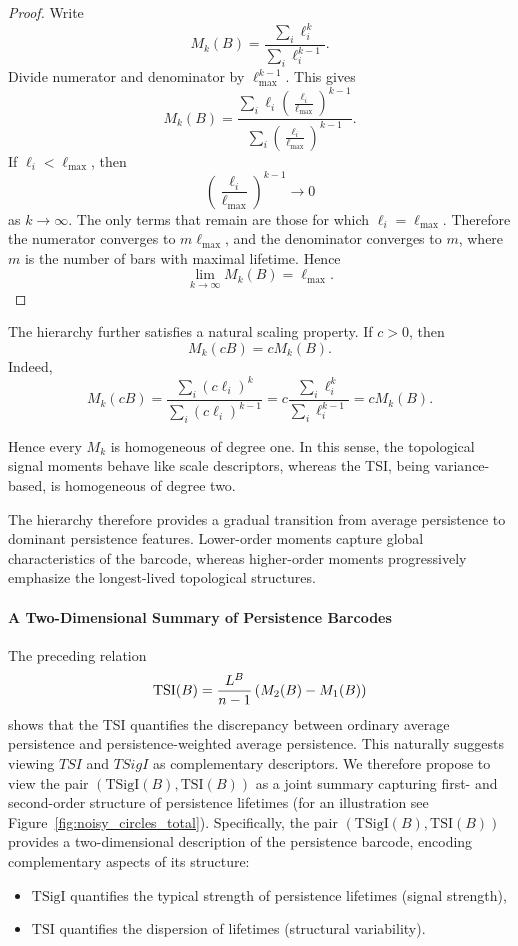 \documentclass[11pt]{amsart}
\theoremstyle{definition}
\newcommand{\tsi}[0]{\textup{TSI}}
\begin{document}
\begin{proof}
Write
\[
M_k(B)=
\frac{\sum_i\ell_i^k}{\sum_i\ell_i^{k-1}}.
\]
Divide numerator and denominator by \(\ell_{\max}^{k-1}\). This gives
\[
M_k(B)
=
\frac{
\sum_i
\ell_i
\left(
\frac{\ell_i}{\ell_{\max}}
\right)^{k-1}
}
{
\sum_i
\left(
\frac{\ell_i}{\ell_{\max}}
\right)^{k-1}
}.
\]
If \(\ell_i<\ell_{\max}\), then
\[
\left(
\frac{\ell_i}{\ell_{\max}}
\right)^{k-1}
\to 0
\]
as \(k\to\infty\). The only terms that remain are those for which
\(\ell_i=\ell_{\max}\). Therefore the numerator converges to \(m\ell_{\max}\), and the denominator converges to \(m\), where \(m\) is the number of bars with maximal lifetime. Hence
\[
\lim_{k\to\infty}M_k(B)=\ell_{\max}.
\]
\end{proof}


The hierarchy further satisfies a natural scaling property. If \(c>0\), then
\[
M_k(cB)
=
cM_k(B).
\]
Indeed,
\[
M_k(cB)
=
\frac{\sum_i(c\ell_i)^k}{\sum_i(c\ell_i)^{k-1}}
=
c
\frac{\sum_i\ell_i^k}{\sum_i\ell_i^{k-1}}
=
cM_k(B).
\]

Hence every \(M_k\) is homogeneous of degree one. In this sense, the topological signal moments behave like scale descriptors, whereas the TSI, being variance-based, is homogeneous of degree two.


The hierarchy therefore provides a gradual transition from average persistence to dominant persistence features. Lower-order moments capture global characteristics of the barcode, whereas higher-order moments progressively emphasize the longest-lived topological structures.

\medskip

\paragraph{{\bf A Two-Dimensional Summary of Persistence Barcodes}}

The preceding relation
\[
\tsi(B)=\frac{L^B}{n-1} \left(M_2(B)-M_1(B)\right)
\]
shows that the TSI quantifies the discrepancy between ordinary average persistence and persistence-weighted average persistence. This naturally
suggests viewing \(TSI\) and \(TSigI\) as complementary descriptors. We therefore propose to view the pair
\((\mathrm{TSigI}(B),\mathrm{TSI}(B))\) as a joint summary capturing first- and second-order structure of persistence lifetimes (for an illustration see Figure~\ref{fig:noisy_circles_total}). Specifically, the pair \((\mathrm{TSigI}(B),\mathrm{TSI}(B))\) provides a two-dimensional description of the persistence barcode, encoding complementary aspects of its structure:
\begin{itemize}
    \item[i.] $\mathrm{TSigI}$ quantifies the typical strength of persistence lifetimes (signal strength),
    \item[ii.] $\mathrm{TSI}$ quantifies the dispersion of  lifetimes (structural variability).
\end{itemize}
\end{document}
